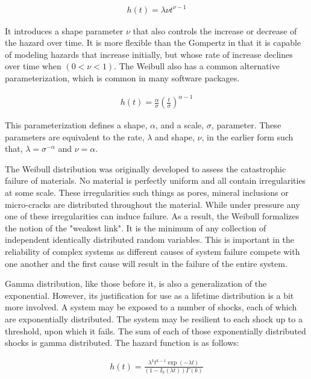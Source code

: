 \begin{align*}
 h(t) = \lambda \nu t^{\nu - 1} \tag{ $\lambda >0, \nu > 0$ }
\end{align*}

It introduces a shape parameter $\nu$ that also controls the increase or decrease of the hazard over time. It is more flexible than the Gompertz in that it is capable of modeling hazards that increase initially, but whose rate of increase declines over time when $(0 < \nu < 1)$. The Weibull also has a common alternative parameterization, which is common in many software packages.

\begin{align*}
h(t) = \frac{\alpha}{\sigma} \left (\frac{t}{\sigma}  \right )^{\alpha - 1} \tag{$\alpha > 0, \sigma > 0$}
\end{align*}

This parameterization defines a shape, $\alpha$, and a scale, $\sigma$, parameter. These parameters are equivalent to the rate, $\lambda$ and shape, $\nu$, in the earlier form such that, $\lambda = \sigma^{-\alpha}$ and $\nu = \alpha$.


The Weibull distribution was originally developed to assess the catastrophic failure of materials. No material is perfectly uniform and all contain irregularities at some scale. These irregularities such things as pores, mineral inclusions or micro-cracks are distributed throughout the material. While under pressure any one of these irregularities can induce failure. As a result, the Weibull formalizes the notion of the "weakest link"\cite{Rinne2008}. It is the minimum of any collection of independent identically distributed random variables. This is important in the reliability of complex systems as different causes of system failure compete with one another and the first cause will result in the failure of the entire system\cite{Quinn2010}.

Gamma distribution, like those before it, is also a generalization of the exponential. However, its justification for use as a lifetime distribution is a bit more involved. A system may be exposed to a number of shocks, each of which are exponentially distributed. The system may be resilient to each shock up to a threshold, upon which it fails. The sum of each of those exponentially distributed shocks is gamma distributed\cite{Tso2010}. The hazard function is as follows:

\begin{align*}
h(t) = \frac{\lambda^k t^{k-1} \exp(-\lambda t)}{(1 - I_k(\lambda t)) \Gamma(k)} \tag{$ k>0, \lambda > 0 $}
\end{align*}

